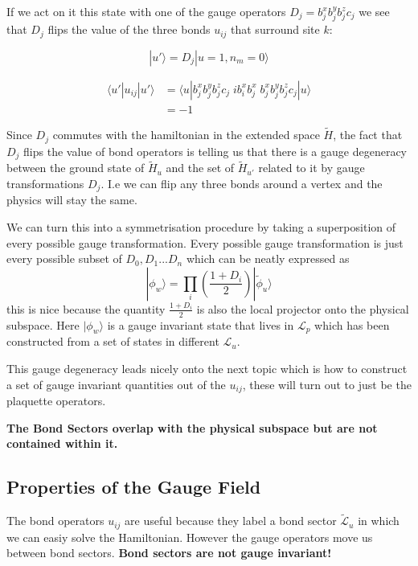 If we act on it this state with one of the gauge operators
\(D_j = b_j^x b_j^y b_j^z c_j\) we see that \(D_j\) flips the value of
the three bonds \(u_{ij}\) that surround site \(k\):

\[ |u'\rangle = D_j |u=1, n_m = 0\rangle\]

\[ \begin{aligned}
\langle u'|u_{ij}|u'\rangle &=  \langle u| b_j^x b_j^y b_j^z c_j \;ib^x_i b^x_j\; b_j^x b_j^y b_j^z c_j|u\rangle\\
&= -1
\end{aligned}\]

Since \(D_j\) commutes with the hamiltonian in the extended space
\(\tilde{H}\), the fact that \(D_j\) flips the value of bond operators
is telling us that there is a gauge degeneracy between the ground state
of \(\tilde{H}_u\) and the set of \(\tilde{H}_{u'}\) related to it by
gauge transformations \(D_j\). I.e we can flip any three bonds around a
vertex and the physics will stay the same.

We can turn this into a symmetrisation procedure by taking a
superposition of every possible gauge transformation. Every possible
gauge transformation is just every possible subset of
\({D_0, D_1 ... D_n}\) which can be neatly expressed as
\[|\phi_w\rangle = \prod_i \left( \frac{1 + D_i}{2}\right) |\tilde{\phi}_u\rangle\]
this is nice because the quantity \(\frac{1 + D_i}{2}\) is also the
local projector onto the physical subspace. Here \(|\phi_w\rangle\) is a
gauge invariant state that lives in \(\mathcal{L}_p\) which has been
constructed from a set of states in different \(\mathcal{L}_u\).

This gauge degeneracy leads nicely onto the next topic which is how to
construct a set of gauge invariant quantities out of the \(u_{ij}\),
these will turn out to just be the plaquette operators.

\textbf{The Bond Sectors overlap with the physical subspace but are not
contained within it.}

\hypertarget{properties-of-the-gauge-field}{%
\subsection{Properties of the Gauge
Field}\label{properties-of-the-gauge-field}}

The bond operators \(u_{ij}\) are useful because they label a bond
sector \(\mathcal{\tilde{L}}_u\) in which we can easiy solve the
Hamiltonian. However the gauge operators move us between bond sectors.
\textbf{Bond sectors are not gauge invariant!}

